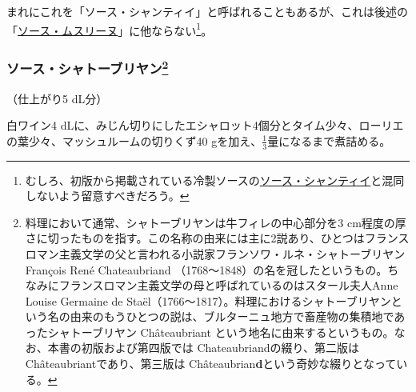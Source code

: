 \begin{recette}


まれにこれを「ソース・シャンティイ」と呼ばれることもあるが、これは後述の「\protect\hyperlink{sauce-mousseline}{ソース・ムスリーヌ}」に他ならない\footnote{むしろ、初版から掲載されている冷製ソースの\protect\hyperlink{sauce-chantilly-froide}{ソース・シャンティイ}と混同しないよう留意すべきだろう。}。

\hypertarget{sauce-chateaubriand}{%
\subsubsection[ソース・シャトーブリヤン]{\texorpdfstring{ソース・シャトーブリヤン\footnote{料理において通常、シャトーブリヤンは牛フィレの中心部分を3
  cm程度の厚さに切ったものを指す。この名称の由来には主に2説あり、ひとつはフランスロマン主義文学の父と言われる小説家フランソワ・ルネ・シャトーブリヤン
  François René Chateaubriand
  （1768〜1848）の名を冠したというもの。ちなみにフランスロマン主義文学の母と呼ばれているのはスタール夫人Anne
  Louise Germaine de
  Staël（1766〜1817）。料理におけるシャトーブリヤンという名の由来のもうひとつの説は、ブルターニュ地方で畜産物の集積地であったシャトーブリヤン
  Châteaubriant
  という地名に由来するというもの。なお、本書の初版および第四版では
  Chateaubriandの綴り、第二版はChâteaubriantであり、第三版は
  Châteaubrian\textbf{d}という奇妙な綴りとなっている。}}{ソース・シャトーブリヤン}}\label{sauce-chateaubriand}}



（仕上がり5 dL分）

白ワイン4
dLに、みじん切りにしたエシャロット4個分とタイム少々、ローリエの葉少々、マッシュルームの切りくず40
gを加え、\(\frac{1}{3}\)量になるまで煮詰める。


\end{recette}
